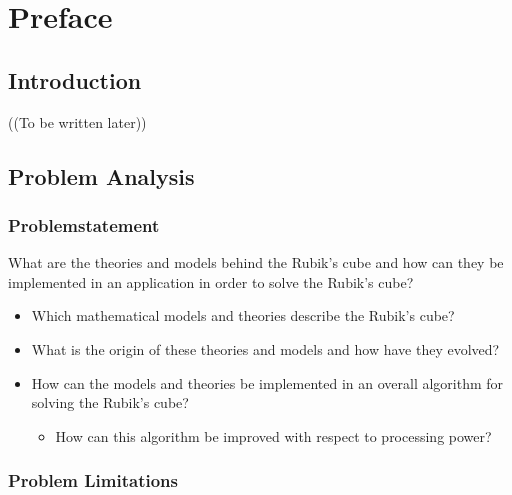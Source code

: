 \part{Preface}
\chapter{Introduction}
((To be written later))
\chapter{Problem Analysis}
\section{Problemstatement}
What are the theories and models behind the Rubik's cube and how can they be implemented in an application in order to solve the Rubik's cube?
\begin{itemize}
	\item Which mathematical models and theories describe the Rubik's cube?
	\item What is the origin of these theories and models and how have they evolved?
	\item How can the models and theories be implemented in an overall algorithm for solving the Rubik's cube?
	\begin{itemize}
		\item How can this algorithm be improved with respect to processing power?
	\end{itemize}
\end{itemize}
\section{Problem Limitations}
	
	
	